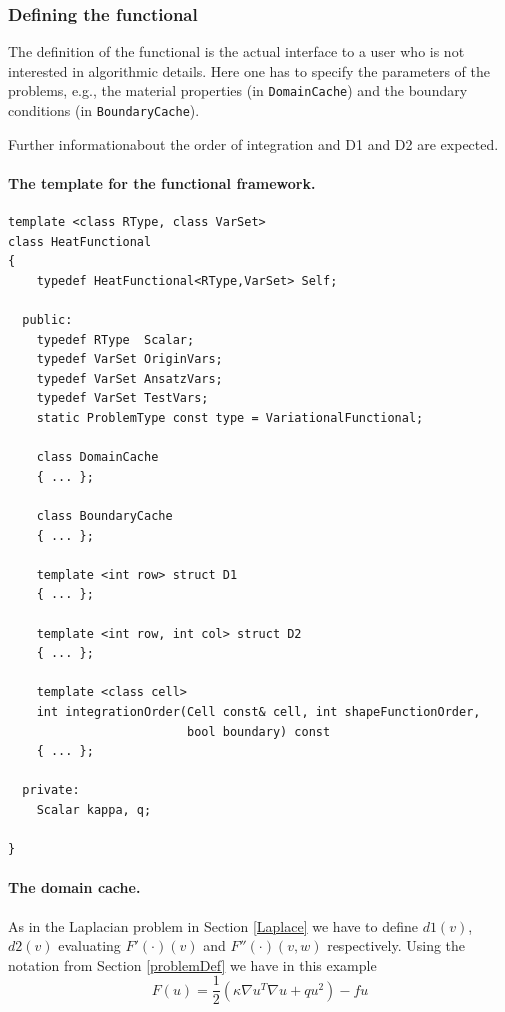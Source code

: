 \documentclass[11pt]{article}
\begin{document}
\subsubsection{Defining the functional} \label{sec:ProblemDefinition}
The definition of the functional is the actual interface to a user who is not interested 
in algorithmic details. Here one has to specify the parameters of the problems, e.g.,
the material properties (in {\tt DomainCache}) and the boundary conditions
(in {\tt BoundaryCache}).

Further informationabout the order of integration and D1 and D2 are expected.

\paragraph{The template for the functional framework.} \qquad

\begin{lstlisting}
template <class RType, class VarSet>
class HeatFunctional
{
    typedef HeatFunctional<RType,VarSet> Self;
    
  public:
    typedef RType  Scalar;
    typedef VarSet OriginVars;
    typedef VarSet AnsatzVars;
    typedef VarSet TestVars;
    static ProblemType const type = VariationalFunctional;
    
    class DomainCache
    { ... };
    
    class BoundaryCache
    { ... };
    
    template <int row> struct D1
    { ... };
    
    template <int row, int col> struct D2
    { ... };
    
    template <class cell>
    int integrationOrder(Cell const& cell, int shapeFunctionOrder, 
                         bool boundary) const
    { ... };
    
  private:
	Scalar kappa, q;

}
\end{lstlisting}


\paragraph{The domain cache.}

As in the Laplacian problem in Section \ref{Laplace} we have to define $d1(v)$, 
$d2(v)$ evaluating $F'(\cdot)(v)$ and $F''(\cdot)(v,w)$ respectively.
Using the notation from Section \ref{problemDef} we have in this example
\[
F(u) = \frac{1}{2}(\kappa \nabla u^T \nabla u  + q u^2) -  f u
\]
\end{document}
